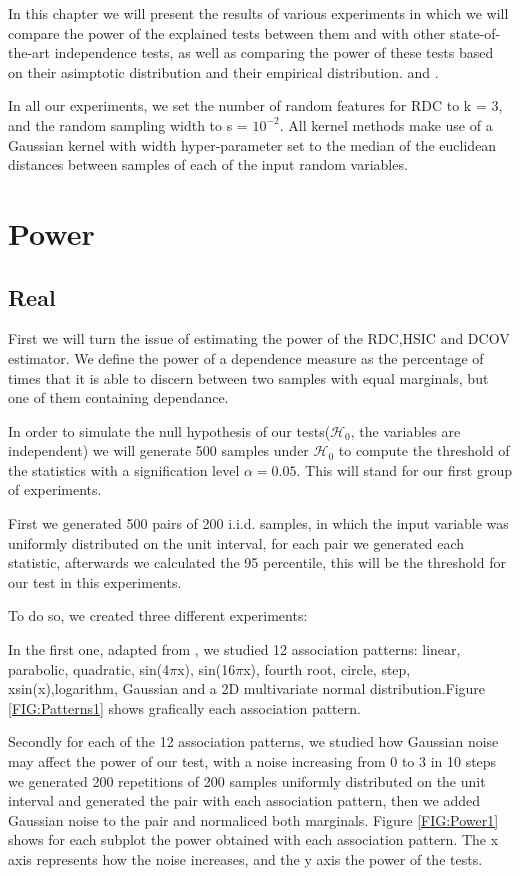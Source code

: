 In this chapter we will present the results of various experiments in which we will compare the power of the explained tests between them and with other state-of-the-art independence tests, as well as comparing the power of these tests based on their asimptotic distribution and their empirical distribution. and \cite{HSICdistribution}.

In all our experiments, we set the number of random features for RDC to k = 3, and the random sampling width to s = $10^{-2}$. All kernel methods make use of a Gaussian kernel with width hyper-parameter set to the median of the euclidean distances between samples of each of the input random variables.

\section{Power}

\subsection{Real}
First we will turn the issue of estimating the power of the RDC,HSIC and DCOV estimator. We define the power of a dependence measure as the percentage of times that it is able to discern between two samples with equal marginals, but one of them containing dependance.

In order to simulate the null hypothesis of our tests($\mathcal{H}_{0}$, the variables are independent) we will generate 500 samples under $\mathcal{H}_{0}$ to compute the threshold of the statistics with a signification level $\alpha = 0.05$. This will stand for our first group of experiments.

First we generated 500 pairs  of 200 i.i.d. samples, in which the input variable was uniformly distributed on the unit interval, for each pair we generated each statistic, afterwards we calculated the 95 percentile, this will be the threshold for our test in this experiments.

To do so, we created three different experiments:

\label{exp:1}In the first one, adapted from \cite{RDC1}, we studied 12 association patterns: linear, parabolic, quadratic, sin(4$\pi$x), sin(16$\pi$x), fourth root, circle, step, xsin(x),logarithm, Gaussian and a 2D multivariate normal distribution.Figure \ref{FIG:Patterns1} shows grafically each association pattern.

Secondly for each of the 12 association patterns, we studied how Gaussian noise may affect the power of our test, with a noise increasing from 0 to 3 in 10 steps we generated 200 repetitions of 200 samples uniformly distributed on the unit interval and generated the pair with each association pattern, then we added Gaussian noise to the pair and normaliced both marginals.
Figure \ref{FIG:Power1} shows for each subplot the power obtained with each association pattern. The x axis represents how the noise increases, and the y axis the power of the tests.

